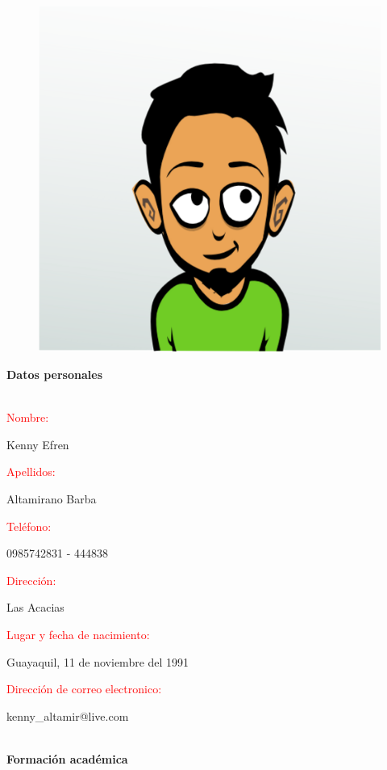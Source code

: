 \documentclass[20pt]{article}
\begin{document}
\begin{figure}
\begin{center}
\includegraphics[width=100 pt]{./chewaka.jpg}
\end{center}
\end{figure}

\begin{center}
\begin{huge}
\textbf{Datos personales}\\\
\end{huge}
\end{center}

\begin{large}
\textcolor{red}{Nombre:}
\end{large}
Kenny Efren\\

\begin{large}
\textcolor{red}{Apellidos:}
\end{large}
Altamirano Barba\\

\begin{large}
\textcolor{red}{Teléfono:}
\end{large}
0985742831 - 444838\\

\begin{large}
\textcolor{red}{Dirección:}
\end{large}
Las Acacias\\

\begin{large}
\textcolor{red}{Lugar y fecha de nacimiento:}
\end{large}
Guayaquil, 11 de noviembre del 1991\\

\begin{large}
\textcolor{red}{Dirección de correo electronico:}
\end{large}
kenny\_altamir@live.com\\\\


\begin{center}
\begin{huge}
\textbf{Formación académica}\\\
\end{huge}
\end{center}
\end{document}

